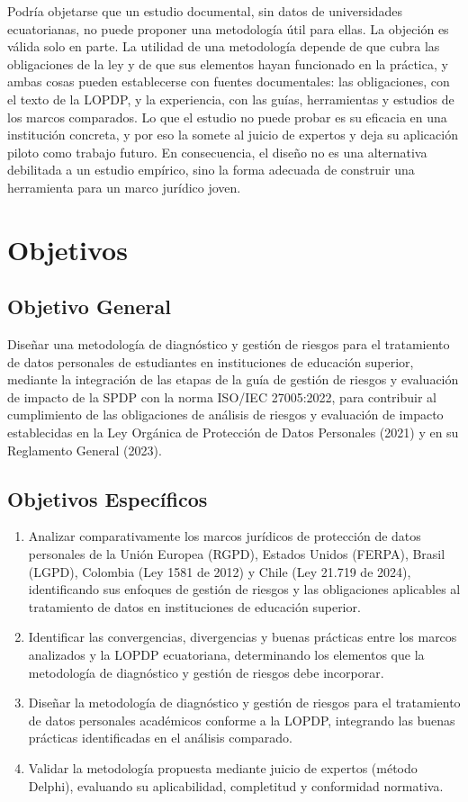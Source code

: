 Podría objetarse que un estudio documental, sin datos de universidades ecuatorianas, no puede proponer una metodología útil para ellas. La objeción es válida solo en parte. La utilidad de una metodología depende de que cubra las obligaciones de la ley y de que sus elementos hayan funcionado en la práctica, y ambas cosas pueden establecerse con fuentes documentales: las obligaciones, con el texto de la LOPDP, y la experiencia, con las guías, herramientas y estudios de los marcos comparados. Lo que el estudio no puede probar es su eficacia en una institución concreta, y por eso la somete al juicio de expertos y deja su aplicación piloto como trabajo futuro. En consecuencia, el diseño no es una alternativa debilitada a un estudio empírico, sino la forma adecuada de construir una herramienta para un marco jurídico joven.

\section{Objetivos}
\subsection{Objetivo General}

Diseñar una metodología de diagnóstico y gestión de riesgos para el tratamiento de datos personales de estudiantes en instituciones de educación superior, mediante la integración de las etapas de la guía de gestión de riesgos y evaluación de impacto de la SPDP con la norma ISO/IEC 27005:2022, para contribuir al cumplimiento de las obligaciones de análisis de riesgos y evaluación de impacto establecidas en la Ley Orgánica de Protección de Datos Personales (2021) y en su Reglamento General (2023).

\subsection{Objetivos Específicos}

\begin{enumerate}
  \item Analizar comparativamente los marcos jurídicos de protección de datos personales de la Unión Europea (RGPD), Estados Unidos (FERPA), Brasil (LGPD), Colombia (Ley 1581 de 2012) y Chile (Ley 21.719 de 2024), identificando sus enfoques de gestión de riesgos y las obligaciones aplicables al tratamiento de datos en instituciones de educación superior.
  \item Identificar las convergencias, divergencias y buenas prácticas entre los marcos analizados y la LOPDP ecuatoriana, determinando los elementos que la metodología de diagnóstico y gestión de riesgos debe incorporar.
  \item Diseñar la metodología de diagnóstico y gestión de riesgos para el tratamiento de datos personales académicos conforme a la LOPDP, integrando las buenas prácticas identificadas en el análisis comparado.
  \item Validar la metodología propuesta mediante juicio de expertos (método Delphi), evaluando su aplicabilidad, completitud y conformidad normativa.
\end{enumerate}

